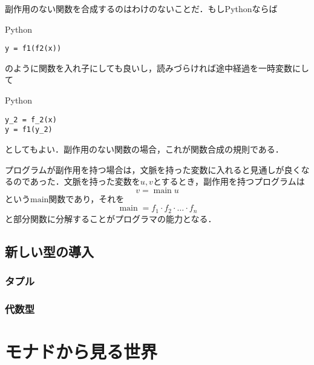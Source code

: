 \documentclass[a5paper,draft]{jsbook}
\newcommand{\programminglanguage}[1]{\textsf{#1}}
\newcommand{\python}{\programminglanguage{Python}}
\newcommand{\code}[1]{\texttt{#1}}
\newenvironment{pythoncode}{\begin{itembox}[r]{\python}}{\end{itembox}}
\DeclareMathOperator{\mathMain}{main}
\newcommand{\mathGeneralMap}{\mathbin{\cdot}}
\begin{document}
副作用のない関数を合成するのはわけのないことだ．もし\python ならば
\begin{pythoncode}
\begin{verbatim}
y = f1(f2(x))
\end{verbatim}
\end{pythoncode}
のように関数を入れ子にしても良いし，読みづらければ途中経過を一時変数にして
\begin{pythoncode}
\begin{verbatim}
y_2 = f_2(x)
y = f1(y_2)
\end{verbatim}
\end{pythoncode}
としてもよい．副作用のない関数の場合，これが関数合成の規則である．

プログラムが副作用を持つ場合は，文脈を持った変数に入れると見通しが良くなるのであった．文脈を持った変数を$u,v$とするとき，副作用を持つプログラムは
\begin{equation}
v=\mathMain u
\end{equation}
という$\text{main}$関数であり，それを
\begin{equation}
\mathMain=f_1\mathGeneralMap f_2\mathGeneralMap\dots\mathGeneralMap f_n
\end{equation}
と部分関数に分解することがプログラマの能力となる．

\chapter{新しい型の導入}

\section{タプル}

\section{代数型}



\part{モナドから見る世界}
\end{document}
